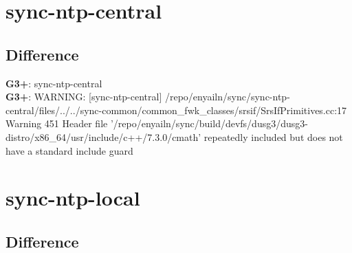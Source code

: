\documentclass[12pt,twoside]{article}
\begin{document}
\section{sync-ntp-central} 
\subsection{Difference} 
  
\textbf{G3+}: sync-ntp-central\\ 
\textbf{G3+}: WARNING: [sync-ntp-central] /repo/enyailn/sync/sync-ntp-central/files/../../sync-common/common\_fwk\_classes/srsif/SrsIfPrimitives.cc:17 Warning 451 Header file '/repo/enyailn/sync/build/devfs/dusg3/dusg3-distro/x86\_64/usr/include/c++/7.3.0/cmath' repeatedly included but does not have a standard include guard\\ 
  
\section{sync-ntp-local} 
\subsection{Difference} 
  
\end{document}
